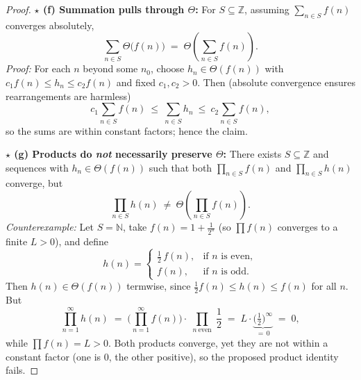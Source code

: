 \documentclass[12pt]{article}
\theoremstyle{definition}
\begin{document}
\begin{proof}
\medskip
\noindent
\textbf{$\star$ (f) Summation pulls through $\Theta$:}
For $S\subseteq\mathbb{Z}$, assuming $\sum_{n\in S} f(n)$ converges absolutely,
\[
\sum_{n\in S} \Theta\big(f(n)\big) \;=\; \Theta\!\left(\sum_{n\in S} f(n)\right).
\]
\emph{Proof:} For each $n$ beyond some $n_0$, choose $h_n\in\Theta(f(n))$ with
$c_1 f(n)\le h_n\le c_2 f(n)$ and fixed $c_1,c_2>0$. Then (absolute convergence ensures rearrangements are harmless)
\[
c_1 \sum_{n\in S} f(n)\ \le\ \sum_{n\in S} h_n\ \le\ c_2 \sum_{n\in S} f(n),
\]
so the sums are within constant factors; hence the claim.

\medskip
\noindent
\textbf{$\star$ (g) Products do \emph{not} necessarily preserve $\Theta$:}
There exists $S\subseteq\mathbb{Z}$ and sequences with $h_n\in\Theta(f(n))$ such that
both $\prod_{n\in S} f(n)$ and $\prod_{n\in S} h(n)$ converge, but
\[
\prod_{n\in S} h(n)\ \neq\ \Theta\!\left(\prod_{n\in S} f(n)\right).
\]
\emph{Counterexample:} Let $S=\mathbb{N}$, take $f(n)=1+\frac{1}{2^{n}}$ (so $\prod f(n)$ converges to a finite $L>0$), and define
\[
h(n)=\begin{cases}
\frac{1}{2}\,f(n), & \text{if $n$ is even},\\[2pt]
f(n), & \text{if $n$ is odd}.
\end{cases}
\]
Then $h(n)\in\Theta(f(n))$ termwise, since $\tfrac12 f(n)\le h(n)\le f(n)$ for all $n$.
But
\[
\prod_{n=1}^{\infty} h(n)\;=\;\Big(\prod_{n=1}^{\infty} f(n)\Big)\cdot \prod_{\substack{n\ \text{even}}}\frac{1}{2}
\;=\; L\cdot \underbrace{\Big(\tfrac12\Big)^{\infty}}_{=\,0}\;=\;0,
\]
while $\prod f(n)=L>0$. Both products converge, yet they are not within a constant factor (one is $0$, the other positive), so the proposed product identity fails.

\end{proof}

\newpage
\end{document}
